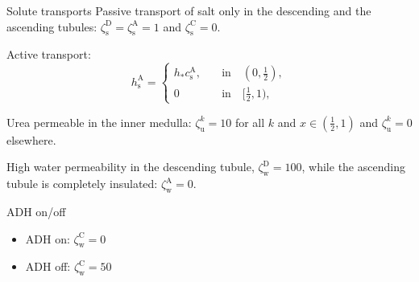\documentclass{beamer}
\begin{document}
\begin{frame}{Solute transports}
    Passive transport of salt only in the descending and the ascending tubules: $\zeta_{\mathrm{s}}^\mathrm{D} = \zeta_{\mathrm{s}}^\mathrm{A} = 1$ and $\zeta_{\mathrm{s}}^\mathrm{C} = 0$.

    \pause
    Active transport:
    \begin{equation}
        h_\mathrm{s}^\mathrm{A} = \begin{cases}
            h_*c_\mathrm{s}^\mathrm{A},\quad  &\text{in}\quad (0,\frac{1}{2}),\\
            0\quad &\text{in}\quad [\frac{1}{2},1),
        \end{cases}
    \end{equation}

    \pause
    Urea permeable in the inner medulla: $\zeta_{\mathrm{u}}^k = 10$ for all $k$ and $x\in (\frac{1}{2},1)$ and $\zeta_{\mathrm{u}}^k =0$ elsewhere.

    \pause
    High water permeability in the descending tubule, $\zeta_\mathrm{w}^\mathrm{D} = 100$, while the ascending tubule is completely insulated: $\zeta_\mathrm{w}^\mathrm{A} = 0$.
\end{frame}

\begin{frame}{ADH on/off}
    \begin{itemize}
        \item ADH on: $\zeta_{\mathrm{w}}^\mathrm{C} = 0$
        \item ADH off: $\zeta_{\mathrm{w}}^\mathrm{C} = 50$
    \end{itemize}
\end{frame}
\end{document}

